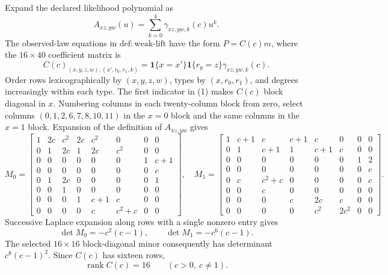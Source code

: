 Expand the declared likelihood polynomial as
\[
 A_{xz,yw}(u)=\sum_{k=0}^4\gamma_{xz,yw,k}(c)u^k.
\]
The observed-law equations in \(\mathrm{def{:}weak\text{-}lift}\) have the form \(P=C(c)m\), where the \(16\times40\) coefficient matrix is
\[
 C(c)_{(x,y,z,w),(x',r_0,r_1,k)}
 =\mathbf 1\{x=x'\}\mathbf 1\{r_y=z\}\gamma_{xz,yw,k}(c). \tag{1}
\]
Order rows lexicographically by \((x,y,z,w)\), types by \((x,r_0,r_1)\), and degrees increasingly within each type.  The first indicator in (1) makes \(C(c)\) block diagonal in \(x\).  Numbering columns in each twenty-column block from zero, select columns \((0,1,2,6,7,8,10,11)\) in the \(x=0\) block and the same columns in the \(x=1\) block.  Expansion of the definition of \(A_{xz,yw}\) gives
\[
M_0=\begin{bmatrix}
1&2c&c^2&2c&c^2&0&0&0\\
0&1&2c&1&2c&c^2&0&0\\
0&0&0&0&0&0&1&c+1\\
0&0&0&0&0&0&0&c\\
0&1&2c&0&0&0&0&1\\
0&0&1&0&0&0&0&0\\
0&0&0&1&c+1&c&0&0\\
0&0&0&0&c&c^2+c&0&0
\end{bmatrix},
\quad
M_1=\begin{bmatrix}
1&c+1&c&c+1&c&0&0&0\\
0&1&c+1&1&c+1&c&0&0\\
0&0&0&0&0&0&1&2\\
0&0&0&0&0&0&0&c\\
0&c&c^2+c&0&0&0&0&c\\
0&0&c&0&0&0&0&0\\
0&0&0&c&2c&c&0&0\\
0&0&0&0&c^2&2c^2&0&0
\end{bmatrix}. \tag{2}
\]
Successive Laplace expansion along rows with a single nonzero entry gives
\[
 \det M_0=-c^2(c-1),
 \qquad
 \det M_1=-c^6(c-1). \tag{3}
\]
The selected \(16\times16\) block-diagonal minor consequently has determinant \(c^8(c-1)^2\).  Since \(C(c)\) has sixteen rows,
\[
 \operatorname{rank}C(c)=16
 \qquad(c>0,\ c\ne1). \tag{4}
\]


